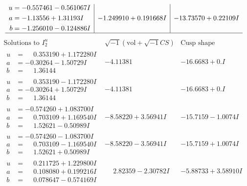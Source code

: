 \documentclass[1p]{elsarticle_modified}
\theoremstyle{definition}
\newcommand{\I}{\sqrt{-1}}
\begin{document}
$$\begin{array}{c|c|c}
\begin{aligned}
u &= -0.557461 - 0.561067 I \\
a &= -1.13556 + 1.31193 I \\
b &= -1.256010 - 0.124886 I\end{aligned}
 & -1.249910 + 0.191668 I & -13.73570 + 0.22109 I\\
 \hline 
 \end{array}$$\newpage$$\begin{array}{c|c|c}  
\text{Solutions to }I^u_{2}& \I (\text{vol} + \sqrt{-1}CS) & \text{Cusp shape}\\
 \hline 
\begin{aligned}
u &= \phantom{-}0.353190 + 1.172280 I \\
a &= -0.30264 - 1.50729 I \\
b &= \phantom{-}1.36144\phantom{ +0.000000I}\end{aligned}
 & -4.11381\phantom{ +0.000000I} & -16.6683 + 0. I\phantom{ +0.000000I} \\ \hline\begin{aligned}
u &= \phantom{-}0.353190 - 1.172280 I \\
a &= -0.30264 + 1.50729 I \\
b &= \phantom{-}1.36144\phantom{ +0.000000I}\end{aligned}
 & -4.11381\phantom{ +0.000000I} & -16.6683 + 0. I\phantom{ +0.000000I} \\ \hline\begin{aligned}
u &= -0.574260 + 1.083700 I \\
a &= \phantom{-}0.703109 + 1.169540 I \\
b &= \phantom{-}1.52621 - 0.50989 I\end{aligned}
 & -8.58220 + 3.56941 I & -15.7159 - 1.0074 I \\ \hline\begin{aligned}
u &= -0.574260 - 1.083700 I \\
a &= \phantom{-}0.703109 - 1.169540 I \\
b &= \phantom{-}1.52621 + 0.50989 I\end{aligned}
 & -8.58220 - 3.56941 I & -15.7159 + 1.0074 I \\ \hline\begin{aligned}
u &= \phantom{-}0.211725 + 1.229800 I \\
a &= \phantom{-}0.108080 + 0.199216 I \\
b &= \phantom{-}0.078647 - 0.574169 I\end{aligned}
 & \phantom{-}2.82359 - 2.30782 I & -5.88733 + 3.58910 I \\ \hline\begin{aligned}

\end{aligned}
\end{array}$$
\end{document}
